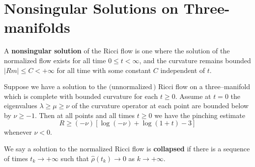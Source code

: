 \section{Nonsingular Solutions on Three-manifolds}
\begin{definition}
  \label{def:cz-nonsingular-normalized-ricci-flow}

A {\bf nonsingular solution} of the
Ricci flow is one where the solution of the normalized flow exists
for all time $0\leq t<\infty$, and the curvature remains bounded
$|Rm|\leq C<+\infty$ for all time with some constant $C$
independent of $t$.
\end{definition}
\begin{theorem}
  \label{thm:cz-hamilton-ivey-pinching-estimate}

Suppose we have a solution to the $($unnormalized$\,)$\; Ricci\;
flow\; on\; a\; three--manifold\; which\; is\; complete\; with
bounded curvature for each $t\geq0$. Assume at $t=0$ the
eigenvalues $\lambda\geq\mu\geq\nu$ of the curvature operator at
each point are bounded below by $\nu\geq-1$. Then at all points
and all times $t\geq0$ we have the pinching estimate
$$
R\geq(-\nu)[\log(-\nu)+\log(1+t)-3]
$$
whenever $\nu<0$.
\end{theorem}
\begin{definition}
  \label{def:cz-collapsed-nonsingular-solution}

We say a solution to the normalized Ricci flow is {\bf
collapsed} if there is a sequence of times
$t_k\rightarrow+\infty$ such that $\hat{\rho}(t_k)\rightarrow0$ as
$k\rightarrow+\infty$.
\end{definition}
